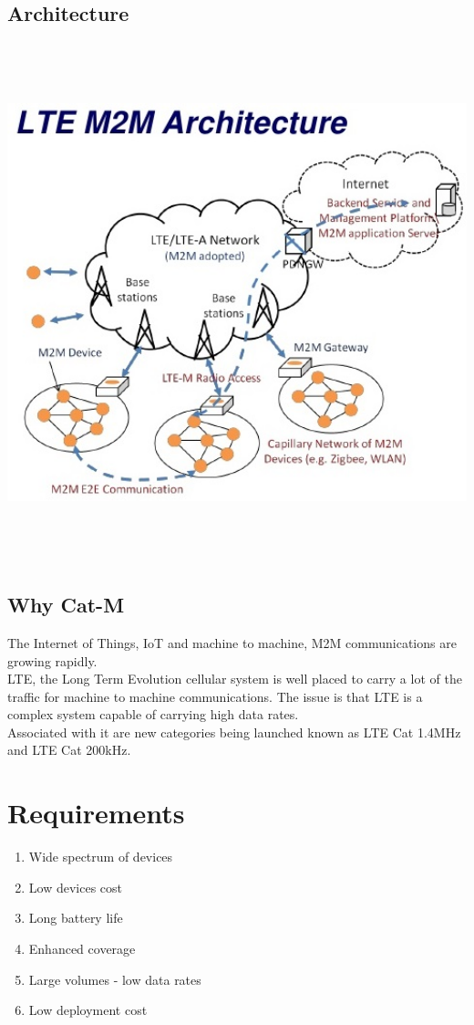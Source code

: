 \documentclass[12pt]{article}
\begin{document}
\subsection{Architecture}
\begin{center}
\includegraphics[width=16cm,height=15cm]{image.jpg}
\pagebreak
\end{center}

\subsection{Why Cat-M}
The Internet of Things, IoT and machine to machine, M2M communications are growing rapidly.\\
LTE, the Long Term Evolution cellular system is well placed to carry a lot of the traffic for machine to machine communications.
The issue is that LTE is a complex system capable of carrying high data rates.\\
Associated with it are new categories being launched known as LTE Cat 1.4MHz and LTE Cat 200kHz.

\pagebreak
\section{Requirements}
\begin{enumerate}
\item Wide spectrum of devices   
\item Low devices cost
\item Long battery life 
\item Enhanced coverage   
\item Large volumes - low data rates
\item Low deployment cost
\end{enumerate}
 
\end{document}
